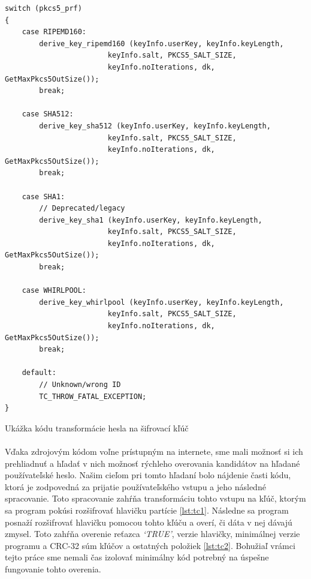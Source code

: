 \begin{listing}
\begin{verbatim}
switch (pkcs5_prf)
{
	case RIPEMD160:
		derive_key_ripemd160 (keyInfo.userKey, keyInfo.keyLength,
						keyInfo.salt, PKCS5_SALT_SIZE,
						keyInfo.noIterations, dk, GetMaxPkcs5OutSize());
		break;

	case SHA512:
		derive_key_sha512 (keyInfo.userKey, keyInfo.keyLength, 
						keyInfo.salt, PKCS5_SALT_SIZE, 
						keyInfo.noIterations, dk, GetMaxPkcs5OutSize());
		break;

	case SHA1:
		// Deprecated/legacy
		derive_key_sha1 (keyInfo.userKey, keyInfo.keyLength,
						keyInfo.salt, PKCS5_SALT_SIZE, 
						keyInfo.noIterations, dk, GetMaxPkcs5OutSize());
		break;

	case WHIRLPOOL:
		derive_key_whirlpool (keyInfo.userKey, keyInfo.keyLength, 
						keyInfo.salt, PKCS5_SALT_SIZE, 
						keyInfo.noIterations, dk, GetMaxPkcs5OutSize());
		break;

	default:		
		// Unknown/wrong ID
		TC_THROW_FATAL_EXCEPTION;
}
\end{verbatim}
\caption{Ukážka kódu transformácie hesla na šifrovací kľúč}
\label{lst:tc1}
\end{listing}

\paragraph{}
Vďaka zdrojovým kódom voľne prístupným na internete, sme mali možnosť si ich prehliadnuť a hľadať v nich možnosť rýchleho overovania kandidátov na hľadané používateľské heslo. Našim cieľom pri tomto hľadaní bolo nájdenie časti kódu, ktorá je zodpovedná za prijatie používateľského vstupu a jeho následné spracovanie. Toto spracovanie zahŕňa transformáciu tohto vstupu na kľúč, ktorým sa program pokúsi rozšifrovať hlavičku partície \ref{lst:tc1}. Následne sa program posnaží rozšifrovať hlavičku pomocou tohto kľúču a overí, či dáta v nej dávajú zmysel. Toto zahŕňa overenie reťazca \emph{`TRUE'}, verzie hlavičky, minimálnej verzie programu a CRC-32 súm kľúčov a ostatných položiek \ref{lst:tc2}. Bohužiaľ vrámci tejto práce sme nemali čas izolovať minimálny kód potrebný na úspešne fungovanie tohto overenia.

